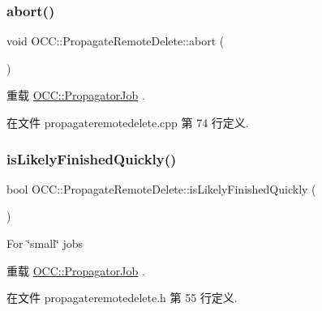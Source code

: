 \subsubsection{\texorpdfstring{abort()}{abort()}}
{\footnotesize\ttfamily void O\+C\+C\+::\+Propagate\+Remote\+Delete\+::abort (\begin{DoxyParamCaption}{ }\end{DoxyParamCaption})\hspace{0.3cm}{\ttfamily [virtual]}}



重载 \hyperlink{class_o_c_c_1_1_propagator_job_a0d33573c817a705179a87db936b8dcb4}{O\+C\+C\+::\+Propagator\+Job} .



在文件 propagateremotedelete.\+cpp 第 74 行定义.

\mbox{\label{class_o_c_c_1_1_propagate_remote_delete_ae58450c9a1deb1d19f52c8f057efbcc0}} 
\subsubsection{\texorpdfstring{is\+Likely\+Finished\+Quickly()}{isLikelyFinishedQuickly()}}
{\footnotesize\ttfamily bool O\+C\+C\+::\+Propagate\+Remote\+Delete\+::is\+Likely\+Finished\+Quickly (\begin{DoxyParamCaption}{ }\end{DoxyParamCaption})\hspace{0.3cm}{\ttfamily [virtual]}}

For \char`\"{}small\char`\"{} jobs 

重载 \hyperlink{class_o_c_c_1_1_propagator_job_a1272ff804d4daf4798f08af6f654944d}{O\+C\+C\+::\+Propagator\+Job} .



在文件 propagateremotedelete.\+h 第 55 行定义.

\mbox{\label{class_o_c_c_1_1_propagate_remote_delete_afa9cfbdf647e648209af60ef224216b9}} 
